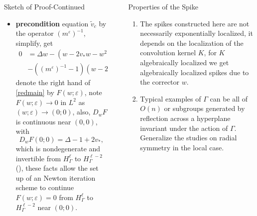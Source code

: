 \documentclass[final]{beamer}
\newlength{\sepwid}
\newlength{\onecolwid}
\newlength{\twocolwid}
\begin{document}
\begin{frame}[t]
\begin{columns}[t]
\begin{column}{\twocolwid}
\begin{columns}[t,totalwidth=\twocolwid]
\begin{column}{\onecolwid}
\begin{block}{ Sketch of Proof-Continued}
\begin{itemize}
\item \textbf{precondition} equation $\tilde{v}_c$ by the operator $(m^\varepsilon)^{-1}$, simplify, get
\begin{align} 
0 &= \Delta w-(w-2v_*w-w^2)\nonumber\\
  &-((m^\varepsilon)^{-1}-1)(w-2v_*w-w^2+\Delta v_*)+O(\varepsilon^2)\label{redmain}
\end{align}
denote the right hand of \eqref{redmain} by $F(w;\varepsilon)$, note $F(w;\varepsilon) \to 0$ in $L^2$ as $(w;\varepsilon) \to (0;0)$, also, $D_wF$ is continuous near $(0,0)$, with $$D_wF(0;0)=\Delta-1+2v_*,$$ which is nondegenerate and invertible from $H^\ell_{\Gamma}$ to $H^{\ell-2}_{\Gamma}$ (\cite{gs}), these facts allow the set up of an Newton iteration scheme to continue $F(w;\varepsilon)=0$ from $H^\ell_{\Gamma}$ to $H^{\ell-2}_{\Gamma}$ near $(0;0)$.
\end{itemize}
\end{block}


\end{column} %

\end{columns} %

\end{column} %

\begin{column}{\sepwid}\end{column} %

\begin{column}{\onecolwid} %


\begin{block}{Properties of the Spike}
\begin{enumerate}
\item  The spikes constructed here are not necessarily exponentially localized, it depends on the localization of the convolution kernel $K$, for $K$ algebraically localized we get algebraically localized spikes due to the corrector $w$.
\item Typical examples of $\Gamma$ can be all of $O(n)$ or subgroups generated by reflection across a hyperplane invariant under the action of $\Gamma$. Generalize the studies on radial symmetry in the local case.
\end{enumerate}
\end{block}


\end{column}
\end{columns}
\end{frame}
\end{document}
